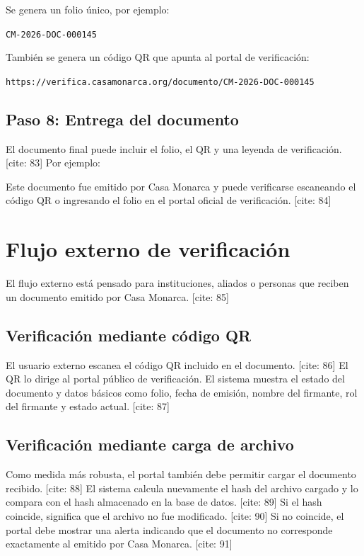 \documentclass[10pt]{article} [cite: 1]
\begin{document}
Se genera un folio único, por ejemplo:

\begin{center}
\texttt{CM-2026-DOC-000145}
\end{center}

También se genera un código QR que apunta al portal de verificación:

\begin{center}
\texttt{https://verifica.casamonarca.org/documento/CM-2026-DOC-000145}
\end{center}

\subsection{Paso 8: Entrega del documento}

El documento final puede incluir el folio, el QR y una leyenda de verificación. [cite: 83] Por ejemplo:

\begin{infobox}
Este documento fue emitido por Casa Monarca y puede verificarse escaneando el código QR o ingresando el folio en el portal oficial de verificación. [cite: 84]
\end{infobox}

\section{Flujo externo de verificación}

El flujo externo está pensado para instituciones, aliados o personas que reciben un documento emitido por Casa Monarca. [cite: 85]

\subsection{Verificación mediante código QR}

El usuario externo escanea el código QR incluido en el documento. [cite: 86] El QR lo dirige al portal público de verificación. El sistema muestra el estado del documento y datos básicos como folio, fecha de emisión, nombre del firmante, rol del firmante y estado actual. [cite: 87]

\subsection{Verificación mediante carga de archivo}

Como medida más robusta, el portal también debe permitir cargar el documento recibido. [cite: 88] El sistema calcula nuevamente el hash del archivo cargado y lo compara con el hash almacenado en la base de datos. [cite: 89] Si el hash coincide, significa que el archivo no fue modificado. [cite: 90] Si no coincide, el portal debe mostrar una alerta indicando que el documento no corresponde exactamente al emitido por Casa Monarca. [cite: 91]
\end{document}
